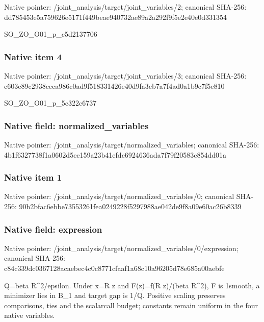 \documentclass[10pt,a4paper]{article}
\begin{document}
Native pointer: /joint\_analysis/target/j\allowbreak{}oint\_variables/2; canonical SHA-256: dd785453e5a759626e5171f4\allowbreak{}49beae940732ae89a2a292f9\allowbreak{}f5e2e40e0d331354


SO\_ZO\_O01\_p\_c5d2137706


\subsubsection{Native item 4}


Native pointer: /joint\_analysis/target/j\allowbreak{}oint\_variables/3; canonical SHA-256: c603c89c2938ceca986c0ad9\allowbreak{}f518331426e40d9fa3cb7a7f\allowbreak{}4ad0a1b9c7f5e810


SO\_ZO\_O01\_p\_5c322c6737


\subsubsection{Native field: normalized\_variables}


Native pointer: /joint\_analysis/target/n\allowbreak{}ormalized\_variables; canonical SHA-256: 4b1f6327738f1a0602d5ec15\allowbreak{}9a23b41efdc6924636ada7f7\allowbreak{}9f20583c854dd01a



\subsubsection{Native item 1}


Native pointer: /joint\_analysis/target/n\allowbreak{}ormalized\_variables/0; canonical SHA-256: 90b2bfac6ebbe73553261fea\allowbreak{}0249228f5297988ae042de9f\allowbreak{}8a09e60ac26b8339



\subsubsection{Native field: expression}


Native pointer: /joint\_analysis/target/n\allowbreak{}ormalized\_variables/0/ex\allowbreak{}pression; canonical SHA-256: c84c339dc0367128acaebec4\allowbreak{}c0c8771cfaaf1a68c10a9620\allowbreak{}5d78e685a00aebfe


Q=beta R\textasciicircum{}2/epsilon. Under x=R z and F(z)=f(R z)/(beta R\textasciicircum{}2), F is 1smooth, a minimizer lies in B\_1 and target gap is 1/Q. Positive scaling preserves comparisons, ties and the scalarcall budget; constants remain uniform in the four native variables.
\end{document}
